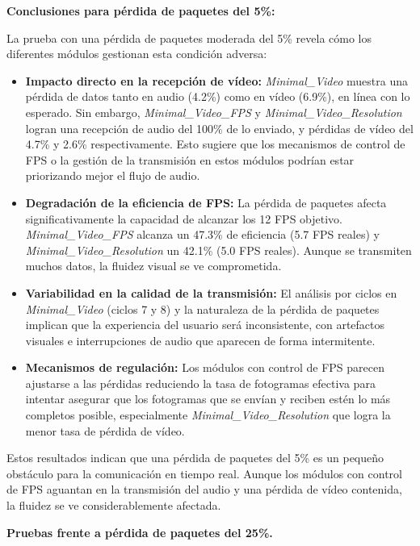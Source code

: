 \vspace{\baselineskip}

\textbf{Conclusiones para pérdida de paquetes del 5\%:}

La prueba con una pérdida de paquetes moderada del 5\% revela cómo los diferentes módulos gestionan esta condición adversa:

\begin{itemize}
\item \textbf{Impacto directo en la recepción de vídeo:} \textit{Minimal\_Video} muestra una pérdida de datos tanto en audio (4.2\%) como en vídeo (6.9\%), en línea con lo esperado. Sin embargo, \textit{Minimal\_Video\_FPS} y \textit{Minimal\_Video\_Resolution} logran una recepción de audio del 100\% de lo enviado, y pérdidas de vídeo del 4.7\% y 2.6\% respectivamente. Esto sugiere que los mecanismos de control de FPS o la gestión de la transmisión en estos módulos podrían estar priorizando mejor el flujo de audio.
\item \textbf{Degradación de la eficiencia de FPS:} La pérdida de paquetes afecta significativamente la capacidad de alcanzar los 12 FPS objetivo. \textit{Minimal\_Video\_FPS} alcanza un 47.3\% de eficiencia (5.7 FPS reales) y \textit{Minimal\_Video\_Resolution} un 42.1\% (5.0 FPS reales). Aunque se transmiten muchos datos, la fluidez visual se ve comprometida.
\item \textbf{Variabilidad en la calidad de la transmisión:} El análisis por ciclos en \textit{Minimal\_Video} (ciclos 7 y 8) y la naturaleza de la pérdida de paquetes implican que la experiencia del usuario será inconsistente, con artefactos visuales e interrupciones de audio que aparecen de forma intermitente.
\item \textbf{Mecanismos de regulación:} Los módulos con control de FPS parecen ajustarse a las pérdidas reduciendo la tasa de fotogramas efectiva para intentar asegurar que los fotogramas que se envían y reciben estén lo más completos posible, especialmente \textit{Minimal\_Video\_Resolution} que logra la menor tasa de pérdida de vídeo.
\end{itemize}

Estos resultados indican que una pérdida de paquetes del 5\% es un pequeño obstáculo para la comunicación en tiempo real. Aunque los módulos con control de FPS aguantan en la transmisión del audio y una pérdida de vídeo contenida, la fluidez se ve considerablemente afectada.
\newpage

\textbf{Pruebas frente a pérdida de paquetes del 25\%.}
\vspace{\baselineskip}


